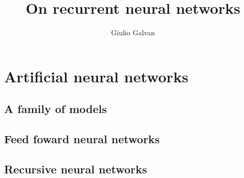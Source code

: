 \documentclass{book}
\title{On recurrent neural networks}
\author{Giulio Galvan}
\theoremstyle{definition}
\begin{document}
\maketitle
\tableofcontents
\chapter{Artificial neural networks}
\section{A family of models}

\section{Feed foward neural networks}

\section{Recursive neural networks}





\newpage
\nocite{*}		 %
{}

\end{document}

